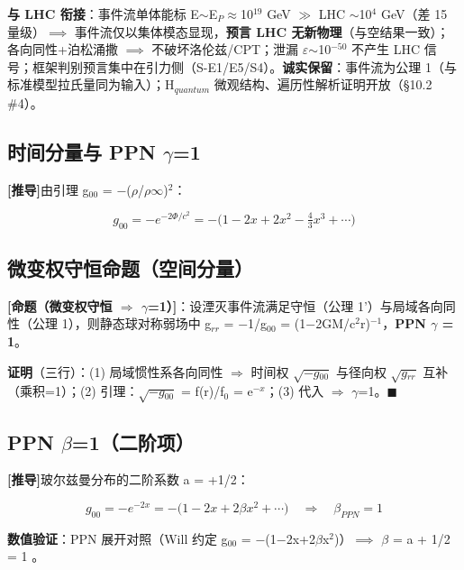 \documentclass[UTF8,fontset=windows]{csoarticle}
\newcommand{\mtag}[1]{\textbf{[#1]}}
\newcommand{\up}[1]{\ensuremath{^{#1}}}
\newcommand{\down}[1]{\ensuremath{_{#1}}}
\begin{document}
\textbf{与 LHC 衔接}：事件流单体能标 E\ensuremath{\sim}E\down{P}\ensuremath{\approx}10\up{19} GeV \ensuremath{\gg} LHC \ensuremath{\sim}10\up{4} GeV（差 15 量级）\ensuremath{\implies} 事件流仅以集体模态显现，\textbf{预言 LHC 无新物理}（与空结果一致）；各向同性+泊松涌撒 \ensuremath{\implies} 不破坏洛伦兹/CPT；泄漏 \ensuremath{\varepsilon}\ensuremath{\sim}10\up{-50} 不产生 LHC 信号；框架判别预言集中在引力侧（S-E1/E5/S4）。\textbf{诚实保留}：事件流为公理 1（与标准模型拉氏量同为输入）；H\down{quantum} 微观结构、遍历性解析证明开放（\S{}10.2 \#4）。

\subsection{时间分量与 PPN \ensuremath{\gamma}=1}

\mtag{推导}由引理 g\down{00} = \ensuremath{-}(\ensuremath{\rho}/\ensuremath{\rho}\ensuremath{\infty})\up{2}：

\[g_{00} = -e^{-2\Phi/c^2} = -\big(1 - 2x + 2x^2 - \tfrac43 x^3 + \cdots\big)\]

\subsection{微变权守恒命题（空间分量）}

\textbf{\mtag{命题（微变权守恒 \ensuremath{\Rightarrow} \ensuremath{\gamma}=1）}}：设湮灭事件流满足守恒（公理 1'）与局域各向同性（公理 1），则静态球对称弱场中 g\down{rr} = \ensuremath{-}1/g\down{00} = (1\ensuremath{-}2GM/c\up{2}r)\up{-1}，\textbf{PPN \ensuremath{\gamma} = 1}。

\textbf{证明}（三行）：(1) 局域惯性系各向同性 \ensuremath{\Rightarrow} 时间权 \ensuremath{\sqrt{-g\down{00}}} 与径向权 \ensuremath{\sqrt{g\down{rr}}} 互补（乘积=1）；(2) 引理：\ensuremath{\sqrt{-g\down{00}}} = f(r)/f\down{0} = e\up{-x}；(3) 代入 \ensuremath{\Rightarrow} \ensuremath{\gamma}=1。\ensuremath{\blacksquare}

\subsection{PPN \ensuremath{\beta}=1（二阶项）}

\mtag{推导}玻尔兹曼分布的二阶系数 a = +1/2：

\[g_{00} = -e^{-2x} = -\big(1 - 2x + 2\beta x^2 + \cdots\big) \quad\Longrightarrow\quad \beta_{PPN} = 1\]

\textbf{数值验证}：PPN 展开对照（Will 约定 g\down{00} = \ensuremath{-}(1\ensuremath{-}2x+2\ensuremath{\beta}x\up{2})）\ensuremath{\implies} \ensuremath{\beta} = a + 1/2 = 1 \checkmark。
\end{document}
